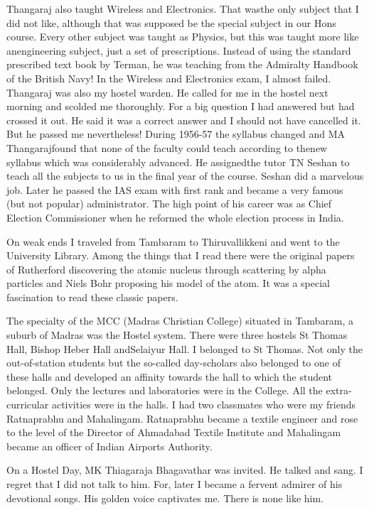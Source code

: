Thangaraj also taught Wireless and Electronics. That was\break the only 
subject that I did not like, although that was supposed be the special 
subject in our Hons course. Every other subject was taught as Physics, 
but this was taught more like an\break engineering subject, just a set of 
prescriptions. Instead of using the standard prescribed text book by 
Terman, he was teaching from the Admiralty Handbook of the British Navy! 
In the Wireless and Electronics exam, I almost failed. Thangaraj was 
also my hostel warden. He called for me in the hostel next morning and 
scolded me thoroughly. For a big question I had answered but had crossed 
it out. He said it was a correct answer and I should not have cancelled 
it. But he passed me nevertheless!
\vskip 1pt
During 1956-57 the syllabus changed and MA Thangaraj\break found that none of 
the faculty could teach according to the\break new syllabus which was 
considerably advanced. He assigned\break the tutor TN Seshan to teach all the 
subjects to us in the final year of the course. Seshan did a marvelous 
job. Later he passed the IAS exam with first rank and became a very 
famous (but not popular) administrator. The high point of his career was 
as Chief Election\- Commissioner when he reformed the whole election 
process in India.


On weak ends I traveled from Tambaram to Thiruvallikkeni and went to 
the University Library. Among the things that I read there were the 
original papers of Rutherford discovering the atomic nucleus through 
scattering by alpha particles and Niels Bohr proposing his model of the 
atom. It was a special fascina\-tion to read these classic papers.
 
The specialty of the MCC (Madras Christian College) situated in 
Tambaram, a suburb of Madras was the Hostel system. There were three 
hostels St Thomas Hall, Bishop Heber Hall and\break Selaiyur Hall. I belonged 
to St Thomas. Not only the out-of-station students but the so-called 
day-scholars also belonged to one of these halls and developed an 
affinity towards the hall to which the student belonged. Only the 
lectures and laboratories were in the College. All the extra-curricular 
activities were in the halls. I had two classmates who were my friends 
Ratna\-prabhu and Mahalingam. Ratnaprabhu became a textile engineer and 
rose to the level of the Director of Ahmadabad Textile Institute and 
Mahalingam became an officer of Indian Airports Authority.

On a Hostel Day, MK Thiagaraja Bhagavathar was invited. He talked and 
sang. I regret that I did not talk to him. For, later I became a fervent 
admirer of his devotional songs. His golden voice captivates me. There 
is none like him.


